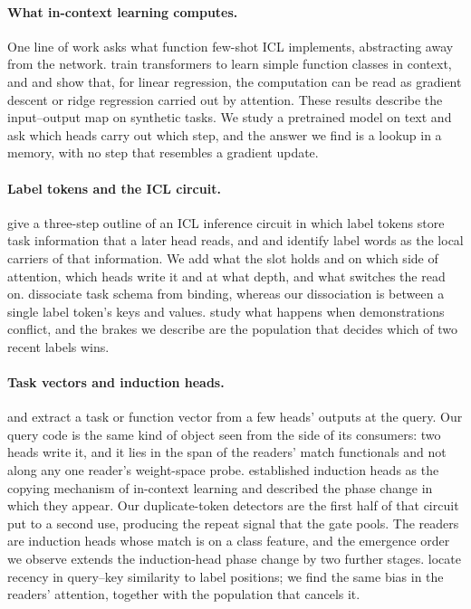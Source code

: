 \documentclass{article}
\begin{document}
\paragraph{What in-context learning computes.} One line of work asks what function few-shot ICL implements, abstracting away from the network. \citet{garg2022functions} train transformers to learn simple function classes in context, and \citet{akyurek2022linear} and \citet{vonoswald2022gd} show that, for linear regression, the computation can be read as gradient descent or ridge regression carried out by attention. These results describe the input--output map on synthetic tasks. We study a pretrained model on text and ask which heads carry out which step, and the answer we find is a lookup in a memory, with no step that resembles a gradient update.

\paragraph{Label tokens and the ICL circuit.} \citet{cho2024circuit} give a three-step outline of an ICL inference circuit in which label tokens store task information that a later head reads, and \citet{zheng2024labelwords} and \citet{hu2025addition} identify label words as the local carriers of that information. We add what the slot holds and on which side of attention, which heads write it and at what depth, and what switches the read on. \citet{kim2025schema} dissociate task schema from binding, whereas our dissociation is between a single label token's keys and values. \citet{jiao2026conflict} study what happens when demonstrations conflict, and the brakes we describe are the population that decides which of two recent labels wins.

\paragraph{Task vectors and induction heads.} \citet{hendel2023taskvectors} and \citet{todd2023fv} extract a task or function vector from a few heads' outputs at the query. Our query code is the same kind of object seen from the side of its consumers: two heads write it, and it lies in the span of the readers' match functionals and not along any one reader's weight-space probe. \citet{olsson2022induction} established induction heads as the copying mechanism of in-context learning and described the phase change in which they appear. Our duplicate-token detectors are the first half of that circuit put to a second use, producing the repeat signal that the gate pools. The readers are induction heads whose match is on a class feature, and the emergence order we observe extends the induction-head phase change by two further stages. \citet{yu2024qk} locate recency in query--key similarity to label positions; we find the same bias in the readers' attention, together with the population that cancels it.
\end{document}
